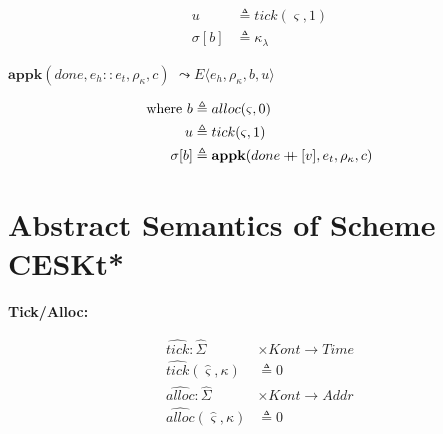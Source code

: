 \documentclass[12pt,draft]{article}
\newcommand\mdoubleplus{\ensuremath{\mathbin{+\mkern-9mu+}}}
\begin{document}
\begin{multicols*}{2}
\begin{align*}
u &\triangleq tick(\varsigma, 1) \\
\sigma[b] &\triangleq \kappa_{\lambda}
\end{align*}
\begin{center}
  $\textbf{appk}(done, e_h::e_t, \rho_\kappa, c)$
  $\leadsto E\langle e_h , \rho_\kappa , b , u \rangle$
\end{center}
\vspace{-7mm}
\begin{align*}
\text{where } b &\triangleq alloc(\varsigma, 0) \\
u &\triangleq tick(\varsigma, 1) \\
\sigma[b] &\triangleq \textbf{appk}(done \mdoubleplus [v], e_t , \rho_{\kappa} , c)
\end{align*}
\end{multicols*}



\newpage
\section{Abstract Semantics of Scheme CESKt*}

\begin{multicols*}{2}
  \begin{center}
    \textbf{Tick/Alloc:}
  \end{center}
  \vspace{-8mm}
\begin{align*}
  \widehat{tick} :  \hat{\Sigma} &\times \textit{Kont} \rightarrow \textit{Time} \\
  \widehat{tick}(\hat{\varsigma}, \kappa) &\triangleq 0 \\
  \widehat{alloc} : \hat{\Sigma} &\times \textit{Kont} \rightarrow \textit{Addr} \\
  \widehat{alloc}(\hat{\varsigma}, \kappa) &\triangleq 0 \\
\end{align*}
\end{multicols*}
\end{document}
